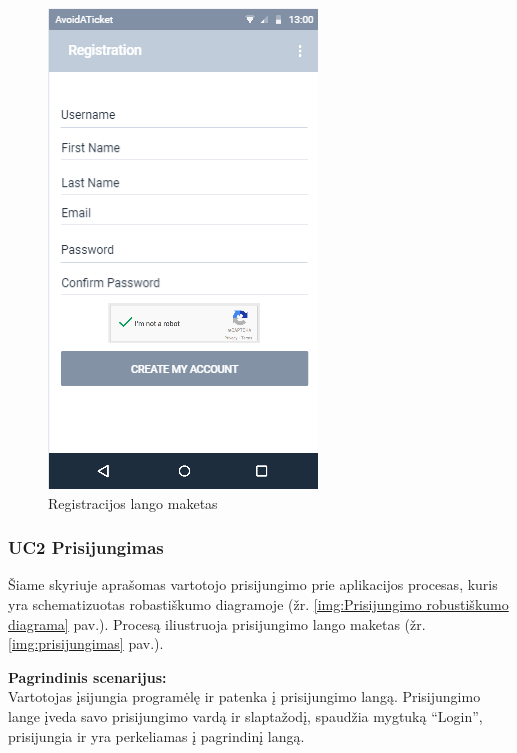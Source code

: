 \documentclass{VUMIFPSkursinis}
\begin{document}
	\begin{figure}[H]
				\centering
				\includegraphics[scale=0.55]{img/mockup_registration}
				\caption{Registracijos lango maketas}
				\label{img:registracija}
			\end{figure}

\subsubsection{UC2 Prisijungimas}
	Šiame skyriuje aprašomas vartotojo prisijungimo prie aplikacijos procesas, kuris yra schematizuotas robastiškumo diagramoje (žr. \ref{img:Prisijungimo robustiškumo diagrama} pav.). 
	Procesą iliustruoja prisijungimo lango maketas (žr. \ref{img:prisijungimas} pav.).

	\textbf{Pagrindinis scenarijus:}\\
	Vartotojas įsijungia programėlę ir patenka į prisijungimo langą. Prisijungimo lange įveda savo prisijungimo vardą ir slaptažodį, 
	spaudžia mygtuką “Login”, prisijungia ir yra perkeliamas į pagrindinį langą.
	
\end{document}
